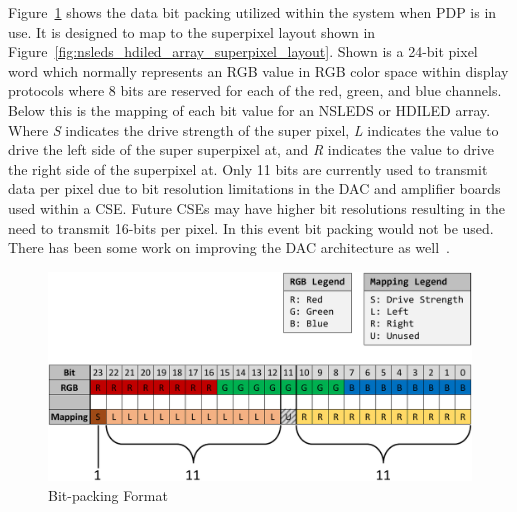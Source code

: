    Figure~\ref{fig:bit_packing} shows the data bit packing utilized within the system when PDP is in use. It is designed to map to the superpixel layout shown in Figure~\ref{fig:nsleds_hdiled_array_superpixel_layout}. Shown is a 24-bit pixel word which normally represents an RGB value in RGB color space within display protocols where 8 bits are reserved for each of the red, green, and blue channels. Below this is the mapping of each bit value for an NSLEDS or HDILED array. Where {\it S} indicates the drive strength of the super pixel, {\it L} indicates the value to drive the left side of the super superpixel at, and {\it R} indicates the value to drive the right side of the superpixel at. Only 11 bits are currently used to transmit data per pixel due to bit resolution limitations in the DAC and amplifier boards used within a CSE. Future CSEs may have higher bit resolutions resulting in the need to transmit 16-bits per pixel. In this event bit packing would not be used. There has been some work on improving the DAC architecture as well~\cite{EjzakEtAl2019}.

    \begin{figure}
        \centering
        \includegraphics[width=1.0\textwidth]{fig/bit_packing.pdf}
        \caption{Bit-packing Format}
        \label{fig:bit_packing}
    \end{figure}

